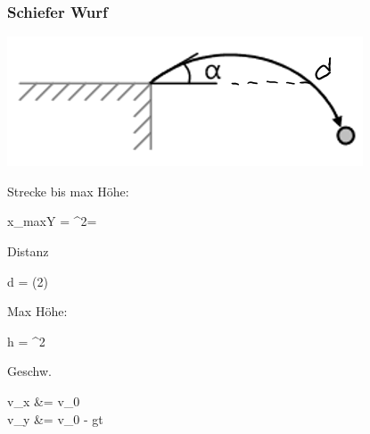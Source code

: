 \subsubsection{Schiefer Wurf }
\begin{minipage}{\textwidth}	
	\begin{minipage}{0.2\textwidth}
		\includegraphics[width=\columnwidth]{./Images/SchiefWurf.png}
	\end{minipage}%
	\begin{minipage}{0.25\textwidth}	
		Strecke bis max Höhe:
		\begin{formula}
			{x_{maxY} = \sin^2\alpha \cdot \cos\alpha = } 
		\end{formula}
		
	 	Distanz
		\begin{formula}
			{d = \cdot\sin(2\alpha)}
		\end{formula}
	
		Max Höhe:
		\begin{formula}
			{h = \sin^2\alpha}
		\end{formula}	
	 	
	 	Geschw.
		\begin{formula}
	 		{v_x &= v_0 \cdot \cos\alpha\\ v_y &= v_0 \cdot \sin\alpha - gt}
	 	\end{formula}	
	
	\end{minipage}
\end{minipage}


